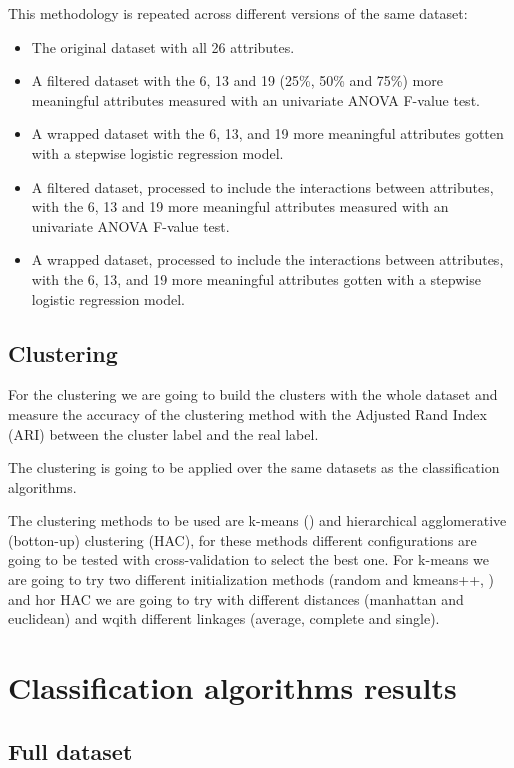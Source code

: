 \documentclass[a4paper,11pt]{article}
\begin{document}
This methodology is repeated across different versions of the same dataset:

\begin{itemize}
	\item The original dataset with all 26 attributes.
	\item A filtered dataset with the 6, 13 and 19 (25\%, 50\% and 75\%) more meaningful attributes measured with an univariate ANOVA F-value test.
	\item A wrapped dataset with the 6, 13, and 19 more meaningful attributes gotten with a stepwise logistic regression model.
	\item A filtered dataset, processed to include the interactions between attributes, with the 6, 13 and 19 more meaningful attributes  measured with an univariate ANOVA F-value test.
	\item A wrapped dataset, processed to include the interactions between attributes, with the 6, 13, and 19 more meaningful attributes gotten with a stepwise logistic regression model.
\end{itemize}

\subsection{Clustering}

For the clustering we are going to build the clusters with the whole dataset and measure the accuracy of the clustering method with the Adjusted Rand Index (ARI) between the cluster label and the real label.

The clustering is going to be applied over the same datasets as the classification algorithms.

The clustering methods to be used are k-means (\cite{forgy1968}) and hierarchical agglomerative (botton-up) clustering (HAC), for these methods different configurations are going to be tested with cross-validation to select the best one. For k-means we are going to try two different initialization methods (random and kmeans++, \cite{arthur2007}) and hor HAC we are going to try with different distances (manhattan and euclidean) and wqith different linkages (average, complete and single).

\section{Classification algorithms results}

\subsection{Full dataset}
\end{document}
